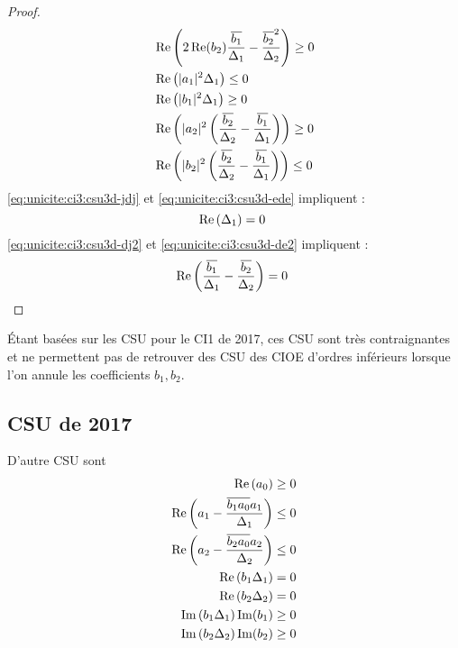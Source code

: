 \begin{proof}
\begin{minipage}{0.49\textwidth}
\begin{align}
        \label{eq:unicite:ci3:csu3d-ere}&\Re\left(2\Re(b_2)\frac{\conj{b_1}}{\Delta_1}-\frac{\conj{b_2}^2}{\Delta_2}\right) \ge 0\\
        \label{eq:unicite:ci3:csu3d-jdj}&\Re\left(|a_1|^2\Delta_1\right) \le 0 \\
        \label{eq:unicite:ci3:csu3d-ede}&\Re\left(|b_1|^2\Delta_1\right) \ge 0 \\
        \label{eq:unicite:ci3:csu3d-dj2}&\Re\left(|a_2|^2\left(\frac{\conj{b_2}}{\Delta_2}-\frac{\conj{b_1}}{\Delta_1}\right)\right)\ge 0\\
        \label{eq:unicite:ci3:csu3d-de2}&\Re\left(|b_2|^2\left(\frac{\conj{b_2}}{\Delta_2}-\frac{\conj{b_1}}{\Delta_1}\right)\right)\le 0
      \end{align}
      \eqref{eq:unicite:ci3:csu3d-jdj} et \eqref{eq:unicite:ci3:csu3d-ede} impliquent :
      \begin{equation}
        \Re\left(\Delta_1\right) = 0\\\
      \end{equation}
      \eqref{eq:unicite:ci3:csu3d-dj2} et \eqref{eq:unicite:ci3:csu3d-de2} impliquent :
      \begin{equation}
        \Re\left(\frac{\conj{b_1}}{\Delta_1}-\frac{\conj{b_2}}{\Delta_2}\right) = 0\\\
      \end{equation}
    \end{minipage}
  \end{proof}

  Étant basées sur les CSU pour le CI1 de 2017, ces CSU sont très contraignantes et ne permettent pas de retrouver des CSU des CIOE d'ordres inférieurs lorsque l'on annule les coefficients \(b_1, b_2\). 


\subsection{CSU de 2017}

  \begin{prop}
    D'autre CSU sont
    \begin{align}
      \Re\left(a_0\right)\ge 0 \\
      \Re\left(a_1 - \frac{\conj{b_1a_0}a_1}{\Delta_1}\right) \le 0 \\
      \Re\left(a_2 - \frac{\conj{b_2a_0}a_2}{\Delta_2}\right) \le 0 \\
      \Re\left(b_1\Delta_1\right) = 0 \\
      \Re\left(b_2\Delta_2\right) = 0 \\
      \Im\left(b_1\Delta_1\right)\Im(b_1)\ge 0\\
      \Im\left(b_2\Delta_2\right)\Im(b_2)\ge 0
    \end{align}
  \end{prop}

